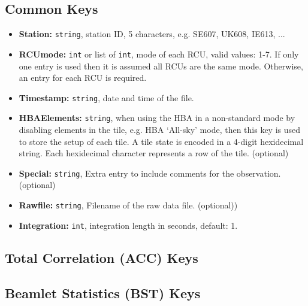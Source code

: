 \documentclass[10pt,a4paper]{article}
\begin{document}
\subsection{Common Keys}
\label{sec:common_keys}

\begin{itemize}
    \item \textbf{Station:} \texttt{string}, station ID, 5 characters, e.g.
    SE607, UK608, IE613, ...
    \item \textbf{RCUmode:} \texttt{int} or list of \texttt{int}, mode of each
    RCU, valid values: 1-7. If only one entry is used then it is assumed all
    RCUs are the same mode. Otherwise, an entry for each RCU is required.
    \item \textbf{Timestamp:} \texttt{string}, date and time of the file.
    \item \textbf{HBAElements:} \texttt{string}, when using the HBA in a
    non-standard mode by disabling elements in the tile, e.g. HBA `All-sky'
    mode, then this key is used to store the setup of each tile. A tile state is
    encoded in a 4-digit hexidecimal string. Each hexidecimal character
    represents a row of the tile. (optional)
    \item \textbf{Special:} \texttt{string}, Extra entry to include comments for
    the observation. (optional)
    \item \textbf{Rawfile:} \texttt{string}, Filename of the raw data file.
    (optional))
    \item \textbf{Integration:} \texttt{int}, integration length in seconds,
    default: 1.
\end{itemize}

\subsection{Total Correlation (ACC) Keys}

\subsection{Beamlet Statistics (BST) Keys}
\label{sec:bst_keys}
\end{document}
